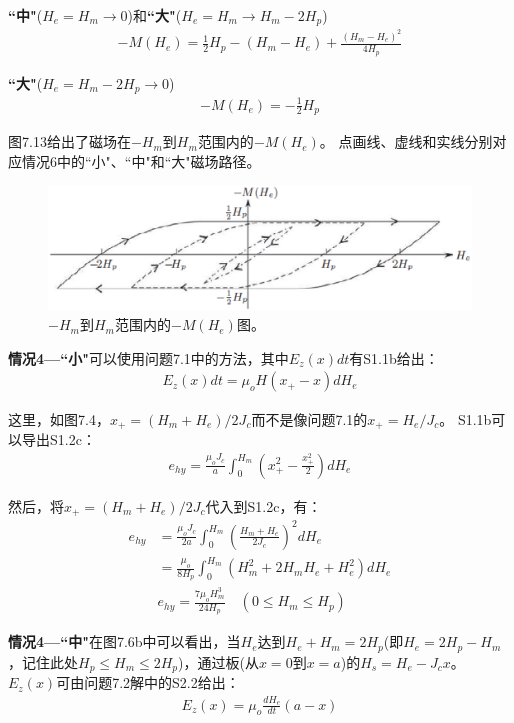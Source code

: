 \textbf{``中"}($H_e=H_m\rightarrow 0$)和\textbf{``大"}($H_e=H_m\rightarrow H_m-2H_p$)
\begin{align*}%
-M(H_e)=\frac{1}{2}H_p-(H_m-H_e)+\frac{(H_m-H_e)^2}{4H_p} \tag{5.7a}
\end{align*}

\textbf{``大"}($H_e=H_m-2H_p\rightarrow 0$)
\begin{align*}%
-M(H_e)=-\frac{1}{2}H_p
\end{align*}

图7.13给出了磁场在$-H_m$到$H_m$范围内的$-M(H_e)$。
点画线、虚线和实线分别对应情况6中的``小"、``中"和``大"磁场路径。
\begin{figure}[htbp]
	\centering
	\includegraphics[scale=0.7]{chpt7/figs/fig7.13.eps}
	\caption{$-H_m$到$H_m$范围内的$-M(H_e)$图。}
\end{figure}

\textbf{情况4---``小"}\quad 可以使用问题7.1中的方法，其中$E_z(x)dt$有S1.1b给出：
\begin{align*}%
E_z(x)dt=\mu_oH(x_+-x)dH_e \tag{S1.1b}
\end{align*}

这里，如图7.4，$x_+=(H_m+H_e)/2J_c$而不是像问题7.1的$x_+=H_e/J_c$。
S1.1b可以导出S1.2c：
\begin{align*}%
e_{hy}=\frac{\mu_oJ_c}{a}\int_{0}^{H_m}\left(x_{+}^{2}-\frac{x_{+}^{2}}{2}\right)dH_e \tag{S1.2c}
\end{align*}

然后，将$x_+=(H_m+H_e)/2J_c$代入到S1.2c，有：
\begin{align*}%
e_{hy}&=\frac{\mu_oJ_c}{2a}\int_{0}^{H_m}\left(\frac{H_m+H_e}{2J_c}\right)^2dH_e \\
&=\frac{\mu_o}{8H_p}\int_{0}^{H_m}(H_{m}^{2}+2H_mH_e+H_{e}^{2})dH_e\\
&e_{hy}=\frac{7\mu_oH_{m}^{3}}{24H_p} \quad(0\le H_m\le H_p) \tag{7.19a}
\end{align*}

\textbf{情况4---``中"}\quad 在图7.6b中可以看出，当$H_e$达到$H_e+H_m=2H_p$(即$H_e=2H_p-H_m$，记住此处$H_p\le H_m\le 2H_p$)，通过板(从$x=0$到$x=a$)的$H_s=H_e-J_c x$。$E_z(x)$可由问题7.2解中的S2.2给出：
\begin{align*}%
E_z(x)=\mu_o\frac{dH_e}{dt}(a-x) \tag{S2.2}
\end{align*}


